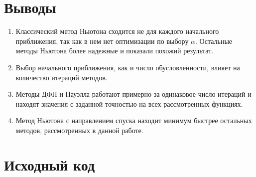 \newpage

\section{Выводы}

\begin{enumerate}
	\item Классический метод Ньютона сходится не для каждого начального приближения, так как в нем нет оптимизации по выбору $\alpha$. Остальные методы Ньютона более надежные и показали похожий результат.

	\item Выбор начального приближения, как и число обусловленности, влияет на количество итераций методов.

	\item Методы ДФП и Пауэлла работают примерно за одинаковое число итераций и находят значения с заданной точностью на всех рассмотренных функциях.

	\item Метод Ньютона с направлением спуска находит минимум быстрее остальных методов, рассмотренных в данной работе.
\end{enumerate}

\newpage

\section{Исходный код}







